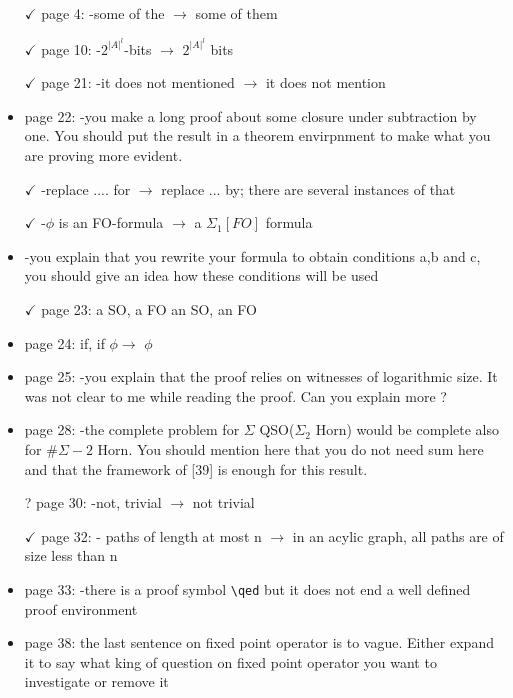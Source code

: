 \begin{itemize}
\item[$\checkmark$] page 4:
-some of the $\to$ some of them 
\item[$\checkmark$] page 10: 
-$2^{|A|^l}$-bits $\to$ $2^{|A|^l}$ bits
\item[$\checkmark$] page 21:
-it does not mentioned $\to$ it does not mention
\item page 22: 
-you make a long proof about some closure under subtraction by one.
You should put the result in a theorem envirpnment to make what you are
proving more evident.
\item[$\checkmark$] -replace .... for $\to$ replace ... by;  there are several instances of
that
\item[$\checkmark$] -$\phi$ is an FO-formula $\to$ a $\Sigma_1[FO]$ formula
\item -you explain that you rewrite your formula to obtain conditions a,b and c, 
you should give an idea how these conditions will be used
\item[$\checkmark$] page 23:
a SO, a FO  an SO, an FO
\item page 24: 
if, if $\phi$$\to$ $\phi$
\item page 25: 
-you explain that the proof relies on witnesses of logarithmic size.
It was not clear to me while reading the proof. Can you explain more ?
\item page 28:
-the complete problem for $\Sigma$ QSO($\Sigma_2$ Horn) would be complete also for $\#\Sigma-2$ Horn. You should mention here that you do not need sum here
and that the framework of [39] is enough for this result.
\item[?] page 30:
-not, trivial $\to$ not trivial
\item[$\checkmark$] page 32: 
- paths of length at most n $\to$ in an acylic graph, all paths are of size less than n
\item page 33:
-there is a proof symbol \verb|\qed| but it does not end a well defined proof environment

\item page 38: 
the last sentence on fixed point operator is to vague. Either expand it to 
say what king of question on fixed point operator you want to investigate or remove it	
\end{itemize}
	